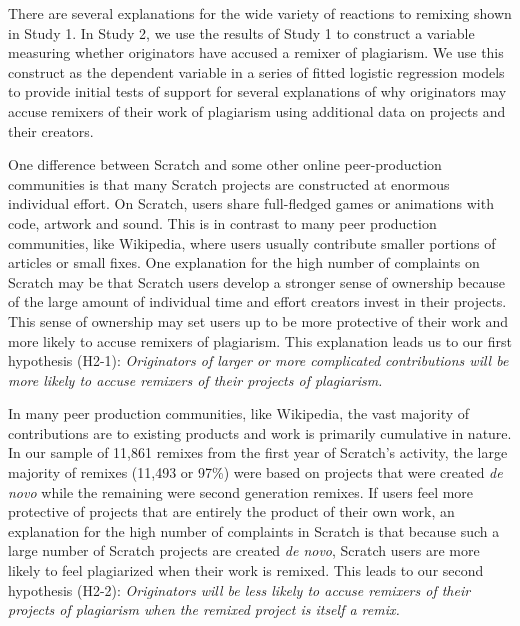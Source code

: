 There are several explanations for the wide variety of reactions to
remixing shown in Study 1. In Study 2, we use the results of Study 1 to
construct a variable measuring whether originators have accused a
remixer of plagiarism.  We use this construct as the dependent
variable in a series of fitted logistic regression models to provide
initial tests of support for several explanations of why originators may
accuse remixers of their work of plagiarism using additional data on projects
and their creators.

One difference between Scratch and some other online peer-production
communities is that many Scratch projects are constructed at enormous
individual effort. On Scratch, users share full-fledged games or
animations with code, artwork and sound.
This is in contrast to many peer production communities, like
Wikipedia, where users usually contribute smaller portions of articles or
small fixes. One explanation for the high number of
complaints on Scratch may be that Scratch users develop a stronger sense
of ownership because of the large amount of individual time and effort
creators invest in their projects. This sense of ownership may set users
up to be more protective of their work and more likely to accuse
remixers of plagiarism.  This explanation leads us to our first
hypothesis (H2-1): {\em Originators of larger or more complicated
contributions will be more likely to accuse remixers of their projects
of plagiarism.}

In many peer production communities, like Wikipedia, the vast majority
of contributions are to existing products and work is primarily
cumulative in nature. In our sample of 11,861 remixes from the first year of Scratch's activity, the large majority of remixes (11,493 or 97\%) were based on
projects that were created {\em de novo} while the remaining were second
generation remixes. If users feel more protective of projects that are
entirely the product of their own work, an explanation for the high
number of complaints in Scratch is that because such a large number of
Scratch projects are created {\em de novo}, Scratch users are more
likely to feel plagiarized when their work is remixed. This leads to our
second hypothesis (H2-2): {\em Originators will be less likely to accuse
remixers of their projects of plagiarism when the remixed project is
itself a remix.}


